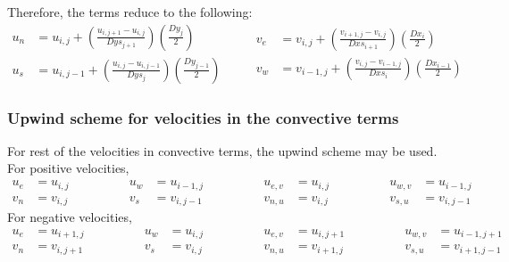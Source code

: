 \documentclass[12pt,a4paper,fleqn]{article}
\begin{document}
Therefore, the terms reduce to the following:
\begin{equation*}
\begin{aligned}
u_n &= u_{i,j} + \left(\frac{u_{i,j+1} - u_{i,j}}{Dys_{j+1}}\right)
\left(\frac{Dy_j}{2}\right)\\
u_s &= u_{i,j-1} + \left(\frac{u_{i,j} - u_{i,j-1}}{Dys_j}\right)
\left(\frac{Dy_{j-1}}{2}\right)
\end{aligned}
\qquad
\begin{aligned}
v_e &= v_{i,j} + \left(\frac{v_{i+1,j} - v_{i,j}}{Dxs_{i+1}}\right)
\left(\frac{Dx_i}{2}\right)\\
v_w &= v_{i-1,j} + \left(\frac{v_{i,j} - v_{i-1,j}}{Dxs_i}\right)
\left(\frac{Dx_{i-1}}{2}\right)
\end{aligned}
\end{equation*}

\subsubsection{Upwind scheme for velocities in the convective terms}
For rest of the velocities in convective terms, the upwind scheme may be used. For positive velocities,
\begin{equation*}
\begin{aligned}
u_e &= u_{i,j}\\
v_n &= v_{i,j}
\end{aligned}
\qquad\qquad
\begin{aligned}
u_w &= u_{i-1,j}\\
v_s &= v_{i,j-1}
\end{aligned}
\qquad\qquad
\begin{aligned}
u_{e,v} &= u_{i,j}\\
v_{n,u} &= v_{i,j}
\end{aligned}
\qquad\qquad
\begin{aligned}
u_{w,v} &= u_{i-1,j}\\ 
v_{s,u} &= v_{i,j-1}
\end{aligned}
\end{equation*}
For negative velocities,
\begin{equation*}
\begin{aligned}
u_e &= u_{i+1,j}\\
v_n &= v_{i,j+1}
\end{aligned}
\qquad\qquad
\begin{aligned}
u_w &= u_{i,j}\\
v_s &= v_{i,j}
\end{aligned}
\qquad\qquad
\begin{aligned}
u_{e,v} &= u_{i,j+1}\\
v_{n,u} &= v_{i+1,j}
\end{aligned}
\qquad\qquad
\begin{aligned}
u_{w,v} &= u_{i-1,j+1}\\ 
v_{s,u} &= v_{i+1,j-1}
\end{aligned}
\end{equation*}
\end{document}
